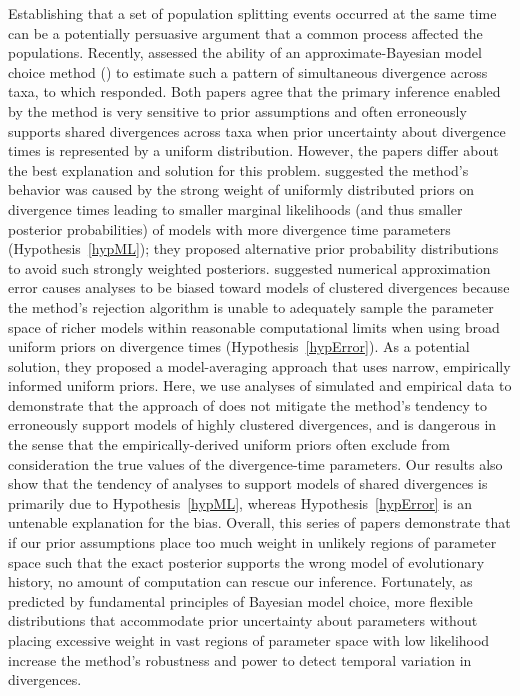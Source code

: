 Establishing that a set of population splitting events occurred at the same
time can be a potentially persuasive argument that a common process affected
the populations.
Recently, \citet{Oaks2012} assessed the ability of an approximate-Bayesian
model choice method (\msb) to estimate such a pattern of simultaneous
divergence across taxa, to which \citet{Hickerson2013} responded.
Both papers agree that the primary inference enabled by the method is very
sensitive to prior assumptions and often erroneously supports shared
divergences across taxa when prior uncertainty about divergence times
is represented by a uniform distribution.
However, the papers differ about the best explanation and solution for this
problem.
\citet{Oaks2012} suggested the method's behavior was caused by the strong
weight of uniformly distributed priors on divergence times leading to smaller
marginal likelihoods (and thus smaller posterior probabilities) of models with
more divergence time parameters (Hypothesis~\ref{hypML}); they proposed
alternative prior probability distributions to avoid such strongly weighted
posteriors.
\citet{Hickerson2013} suggested numerical approximation error causes \msb
analyses to be biased toward models of clustered divergences because the
method's rejection algorithm is unable to adequately sample the parameter space
of richer models within reasonable computational limits when using broad
uniform priors on divergence times (Hypothesis~\ref{hypError}).
As a potential solution, they proposed a model-averaging approach that uses
narrow, empirically informed uniform priors.
Here, we use analyses of simulated and empirical data to demonstrate that the
approach of \citet{Hickerson2013} does not mitigate the method's tendency to
erroneously support models of highly clustered divergences, and is dangerous in
the sense that the empirically-derived uniform priors often exclude from
consideration the true values of the divergence-time parameters.
Our results also show that the tendency of \msb analyses to support models of
shared divergences is primarily due to Hypothesis~\ref{hypML}, whereas
Hypothesis~\ref{hypError} is an untenable explanation for the bias.
Overall, this series of papers demonstrate that if our prior assumptions place
too much weight in unlikely regions of parameter space such that the exact
posterior supports the wrong model of evolutionary history, no amount of
computation can rescue our inference. 
Fortunately, as predicted by fundamental principles of Bayesian model choice,
more flexible distributions that accommodate prior uncertainty about parameters
without placing excessive weight in vast regions of parameter space with low
likelihood increase the method's robustness and power to detect temporal
variation in divergences.
